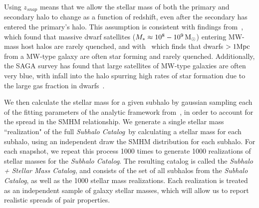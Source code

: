 \documentclass[twocolumn]{aastex631}
\newcommand{\subcat}{\textit{Subhalo Catalog}}
\newcommand{\starcat}{\textit{Subhalo + Stellar Mass Catalog}}
\begin{document}
    Using $z_{snap}$ means that we allow the stellar mass of both the primary and secondary halo to change as a function of redshift, even after the secondary has entered the primary's halo. %
    This assumption is consistent with findings from~\cite{Akins2021}, which found that massive dwarf satellites ($M_*\approx 10^8-10^9\, \mathrm{M}_\odot$) entering MW-mass host halos are rarely quenched, and with~\cite{geha13} which finds that dwarfs $>1\mathrm{Mpc}$ from a MW-type galaxy are often star forming and rarely quenched.
    Additionally, the SAGA survey has found that large satellites of MW-type galaxies are often very blue, with infall into the halo spurring high rates of star formation due to the large gas fraction in dwarfs~\citep{Mao2021}. 

    We then calculate the stellar mass for a given subhalo by gaussian sampling each of the fitting parameters of the analytic framework from~\cite{Moster2013}, in order to account for the spread in the SMHM relationship.
    We generate a single stellar mass ``realization" of the full \subcat\ by calculating a stellar mass for each subhalo, using an independent draw the SMHM distribution for each subhalo. 
    For each snapshot, we repeat this process 1000 times to generate 1000 realizations of stellar masses for the \subcat.
    The resulting catalog is called the \starcat, and consists of the set of all subhalos from the \subcat, as well as the 1000 stellar mass realizations. 
    Each realization is treated as an independent sample of galaxy stellar masses, which will allow us to report realistic spreads of pair properties.



\end{document}
